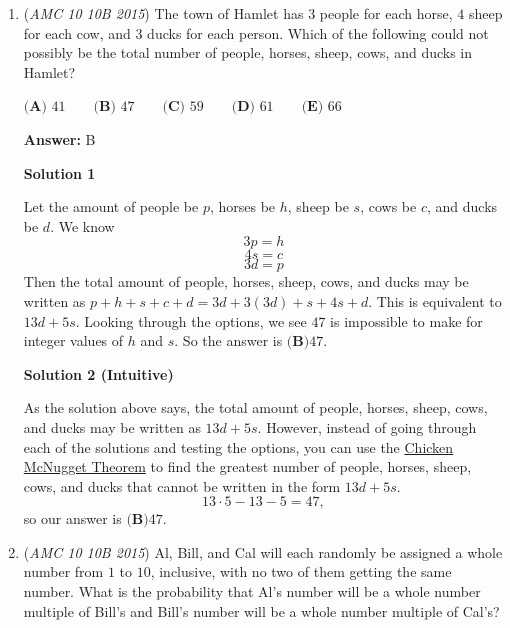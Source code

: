 \begin{enumerate}
 



\textbf{Solution 2}

Factoring out $(x-b)$ from the equation yields $(x-b)(2x-(a+c))=0 \Rightarrow (x-b)\left(x-\frac{a+c}{2}\right)=0$. Therefore the roots are $b$ and $\frac{a+c}{2}$. Because $b$ must be the larger root to maximize the sum of the roots, letting $a,b,$ and $c$ be $8,9,$ and $7$ respectively yields the sum $9+\frac{8+7}{2} = 9+7.5 = \boxed{\textbf{(D)}~16.5}$.

 


	\item (\textit{AMC 10 10B 2015}) The town of Hamlet has $3$ people for each horse, $4$ sheep for each cow, and $3$ ducks for each person. Which of the following could not possibly be the total number of people, horses, sheep, cows, and ducks in Hamlet?


 $\textbf{(A) } 41 \qquad\textbf{(B) } 47 \qquad\textbf{(C) } 59 \qquad\textbf{(D) } 61 \qquad\textbf{(E) } 66$

 \textbf{Answer: }B



\textbf{Solution 1}

Let the amount of people be $p$, horses be $h$, sheep be $s$, cows be $c$, and ducks be $d$. We know 
 \[3p=h\] 
 \[4s=c\] 
 \[3d=p\] Then the total amount of people, horses, sheep, cows, and ducks may be written as $p+h+s+c+d = 3d+3(3d)+s+4s+d$. This is equivalent to $13d+5s$. Looking through the options, we see $47$ is impossible to make for integer values of $h$ and $s$. So the answer is $\boxed{\textbf{(B)} 47}$.

 



\textbf{Solution 2 (Intuitive)}

As the solution above says, the total amount of people, horses, sheep, cows, and ducks may be written as $13d+5s$. However, instead of going through each of the solutions and testing the options, you can use the \href{https://artofproblemsolving.com/wiki/index.php?title=Chicken\_McNugget\_Theorem}{Chicken McNugget Theorem} to find the greatest number of people, horses, sheep, cows, and ducks that cannot be written in the form $13d+5s$. 
 \[13\cdot 5-13-5=47,\] so our answer is $\boxed{\textbf{(B)} 47}$.

 


	\item (\textit{AMC 10 10B 2015}) Al, Bill, and Cal will each randomly be assigned a whole number from $1$ to $10$, inclusive, with no two of them getting the same number. What is the probability that Al's number will be a whole number multiple of Bill's and Bill's number will be a whole number multiple of Cal's?



\end{enumerate}

